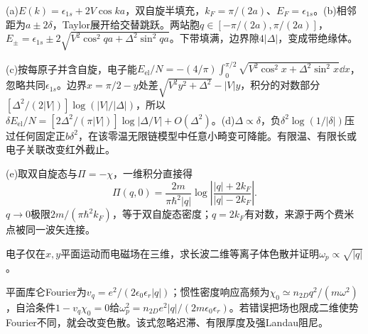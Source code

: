 \begin{solution}
(a)$E(k)=\epsilon_{1s}+2V\cos ka$，双自旋半填充，$k_F=\pi/(2a)$、$E_F=\epsilon_{1s}$。(b)相邻距为$a\pm2\delta$，Taylor展开给交替跳跃。两站胞$q\in[-\pi/(2a),\pi/(2a)]$，$E_\pm=\epsilon_{1s}\pm2\sqrt{V^2\cos^2qa+\Delta^2\sin^2qa}$。下带填满，边界隙$4|\Delta|$，变成带绝缘体。

(c)按每原子并含自旋，电子能$E_{\mathrm{el}}/N=-(4/\pi)\int_0^{\pi/2}\sqrt{V^2\cos^2x+\Delta^2\sin^2x}\dd x$，忽略共同$\epsilon_{1s}$。边界$x=\pi/2-y$处差$\sqrt{V^2y^2+\Delta^2}-|V|y$，积分的对数部分$[\Delta^2/(2|V|)]\log(|V|/|\Delta|)$，所以$\delta E_{\mathrm{el}}/N=[2\Delta^2/(\pi|V|)]\log|\Delta/V|+O(\Delta^2)$。(d)$\Delta\propto\delta$，负$\delta^2\log(1/|\delta|)$压过任何固定正$b\delta^2$，在该零温无限链模型中任意小畸变可降能。有限温、有限长或电子关联改变红外截止。

(e)取双自旋态与$\Pi=-\chi$，一维积分直接得
\begin{equation}
\Pi(q,0)=\frac{2m}{\pi\hbar^2|q|}\log\left|\frac{|q|+2k_F}{|q|-2k_F}\right|.
\end{equation}
$q\to0$极限$2m/(\pi\hbar^2k_F)$，等于双自旋态密度；$q=2k_F$有对数，来源于两个费米点被同一波矢连接。
\end{solution}
\begin{exercise}[原题2]\label{p:512-3-2}
电子仅在$x,y$平面运动而电磁场在三维，求长波二维等离子体色散并证明$\omega_p\propto\sqrt{|q|}$。
\end{exercise}
\begin{solution}
平面库仑Fourier为$v_q=e^2/(2\epsilon_0\epsilon_r|q|)$；惯性密度响应高频为$\chi_0\simeq n_{2D}q^2/(m\omega^2)$，自洽条件$1-v_q\chi_0=0$给$\omega_p^2=n_{2D}e^2|q|/(2m\epsilon_0\epsilon_r)$。若错误把场也限成二维使势Fourier不同，就会改变色散。该式忽略迟滞、有限厚度及强Landau阻尼。
\end{solution}
